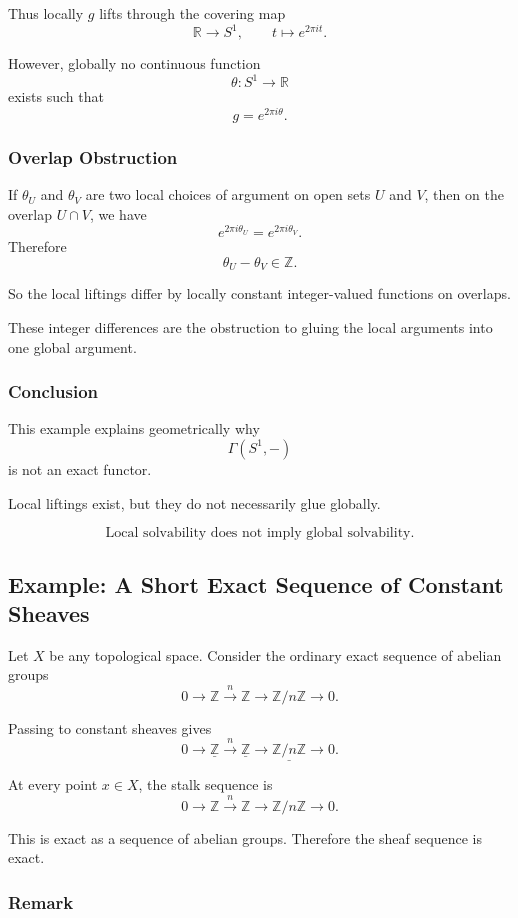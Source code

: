 \documentclass[12pt,a4paper]{article}
\newcommand{\RR}{\mathbb{R}}
\newcommand{\ZZ}{\mathbb{Z}}
\theoremstyle{notespace}
\newcommand{\SSone}{S^1}
\begin{document}
Thus locally \(g\) lifts through the covering map
\[
\RR\to \SSone,
\qquad
t\mapsto e^{2\pi i t}.
\]

However, globally no continuous function
\[
\theta:\SSone\to \RR
\]
exists such that
\[
g=e^{2\pi i\theta}.
\]

\subsubsection*{Overlap Obstruction}

If \(\theta_U\) and \(\theta_V\) are two local choices of argument on open sets \(U\) and \(V\), then on the overlap \(U\cap V\), we have
\[
e^{2\pi i\theta_U}=e^{2\pi i\theta_V}.
\]
Therefore
\[
\theta_U-\theta_V\in \ZZ.
\]

So the local liftings differ by locally constant integer-valued functions on overlaps.

These integer differences are the obstruction to gluing the local arguments into one global argument.

\subsubsection*{Conclusion}

This example explains geometrically why
\[
\Gamma(\SSone,-)
\]
is not an exact functor.

Local liftings exist, but they do not necessarily glue globally.

\[
\boxed{
	\text{Local solvability does not imply global solvability.}
}
\]

\subsection{Example: A Short Exact Sequence of Constant Sheaves}

Let \(X\) be any topological space. Consider the ordinary exact sequence of abelian groups
\[
0\to \ZZ
\xrightarrow{n}
\ZZ
\to
\ZZ/n\ZZ
\to 0.
\]

Passing to constant sheaves gives
\[
0\to \underline{\ZZ}
\xrightarrow{n}
\underline{\ZZ}
\to
\underline{\ZZ/n\ZZ}
\to 0.
\]

At every point \(x\in X\), the stalk sequence is
\[
0\to \ZZ
\xrightarrow{n}
\ZZ
\to
\ZZ/n\ZZ
\to 0.
\]

This is exact as a sequence of abelian groups. Therefore the sheaf sequence is exact.

\subsubsection*{Remark}
\end{document}
